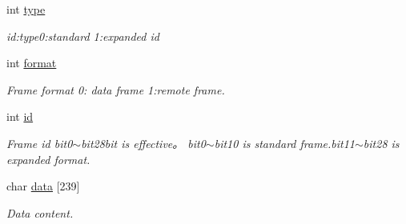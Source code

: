 \begin{DoxyCompactItemize}
\item 
\mbox{\label{struct_p_v_s_d_k___m_o_u_n_t_a_p_i___c_a_n___d_a_t_a_a5c4d6a5c9452e4991aa4f069d5a021f9}} 
int \hyperlink{struct_p_v_s_d_k___m_o_u_n_t_a_p_i___c_a_n___d_a_t_a_a5c4d6a5c9452e4991aa4f069d5a021f9}{type}
\begin{DoxyCompactList}\small\item\em id\+:type0\+:standard 1\+:expanded id \end{DoxyCompactList}\item 
\mbox{\label{struct_p_v_s_d_k___m_o_u_n_t_a_p_i___c_a_n___d_a_t_a_a0b9733687fff7041bcb8c42547964490}} 
int \hyperlink{struct_p_v_s_d_k___m_o_u_n_t_a_p_i___c_a_n___d_a_t_a_a0b9733687fff7041bcb8c42547964490}{format}
\begin{DoxyCompactList}\small\item\em Frame format 0\+: data frame 1\+:remote frame. \end{DoxyCompactList}\item 
\mbox{\label{struct_p_v_s_d_k___m_o_u_n_t_a_p_i___c_a_n___d_a_t_a_ab5123078c73e751bb4b33aa411cc742a}} 
int \hyperlink{struct_p_v_s_d_k___m_o_u_n_t_a_p_i___c_a_n___d_a_t_a_ab5123078c73e751bb4b33aa411cc742a}{id}
\begin{DoxyCompactList}\small\item\em Frame id bit0$\sim$bit28bit is effective。 bit0$\sim$bit10 is standard frame.\+bit11$\sim$bit28 is expanded format. \end{DoxyCompactList}\item 
\mbox{\label{struct_p_v_s_d_k___m_o_u_n_t_a_p_i___c_a_n___d_a_t_a_aaf2d373e8a885dca140afca32cbec1c5}} 
char \hyperlink{struct_p_v_s_d_k___m_o_u_n_t_a_p_i___c_a_n___d_a_t_a_aaf2d373e8a885dca140afca32cbec1c5}{data} \mbox{[}239\mbox{]}
\begin{DoxyCompactList}\small\item\em Data content. \end{DoxyCompactList}\item 
\mbox{\label{struct_p_v_s_d_k___m_o_u_n_t_a_p_i___c_a_n___d_a_t_a_a7d08db338210f85a676338147171efbb}} 

\end{DoxyCompactItemize}
